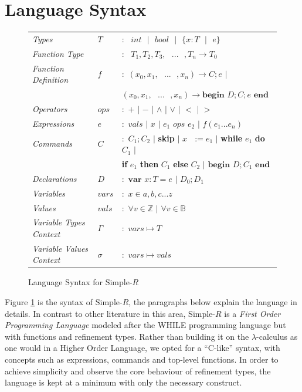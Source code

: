\documentclass[a4paper,12pt]{report}
\begin{document}
\section{Language Syntax}
\begin{figure}[h]
  \begin{center}
    \begin{tabular}{l l l}
      \textit{Types} & $T$ & $:\text{ }int\text{ }|\text{ }bool\text{ }|
      \text{ }\{x: T\text{ }|\text{ }e\}$\\
      \textit{Function Type} &  & $:\text{ }T_1, T_2,T_3,\text{ }...\text{ },T_n\longrightarrow T_0$\\
      \textit{Function Definition} & $f$ & $:$ $(x_0,x_1,\text{ }...\text{ },x_n) \longrightarrow C;e$ $|$ \\ 
      & & \; $(x_0,x_1,\text{ }...\text{ },x_n) \longrightarrow \textbf{begin } D;C;e\textbf{ end}$\\
      \textit{Operators} & $ops$ & $:$ $+$ $|$ $-$ $|$ $\wedge$ $|$ $\vee$ $|$ $<$ $|$ $>$ \\
      \textit{Expressions} & $e$ & $:$ $vals$ $|$ $x$ $|$ $e_1$ $ops$ $e_2$ 
      $|$ $f(e_1...e_n)$ \\
      \textit{Commands} & $C$ & $:$ $C_1;C_2$ $|$ \textbf{skip} $|$ $x\text{ }:= e_1$ 
      $|$ \textbf{while} $e_1$ \textbf{do} $C_1$ $|$ \\ 
        & & \; \textbf{if} $e_1$ \textbf{then} $C_1$ \textbf{else} $C_2$ $|$ 
        $\textbf{begin } D;C_1\textbf{ end}$ \\
      \textit{Declarations} & $D$ & $:$ $\textbf{var } x : T = e$ $|$ $D_0;D_1$\\
      \textit{Variables} & $vars$& $:$ $x \in {a,b,c...z}$\\
      \textit{Values} & $vals$& $:$ $\forall v \in \mathbb{Z}$ $|$ $\forall v \in \mathbb{B}$\\
      \textit{Variable Types Context} & $\Gamma$& $:$ $vars \mapsto T$\\
      \textit{Variable Values Context} & $\sigma$& $:$ $vars \mapsto vals$
    \end{tabular}
  \end{center}
  \caption{Language Syntax for Simple-$R$}
  \label{fig:simple_r_syntax}
\end{figure}

\par
Figure \ref{fig:simple_r_syntax} is the syntax of Simple-$R$, the paragraphs below 
explain the language in details. In contrast to other literature in this area, 
Simple-$R$ is a \textit{First Order Programming Language} \cite{FOL} modeled 
after the WHILE \cite{whileLanguage} programming language but with functions 
and refinement types. Rather than building it on the $\lambda$-calculus as one would in 
a Higher Order Language, we opted for a ``C-like'' syntax, with concepts such as 
expressions, commands and top-level functions. 
In order to achieve simplicity and observe the core behaviour of refinement 
types, the language is kept at a minimum with only the necessary construct. 
\end{document}
